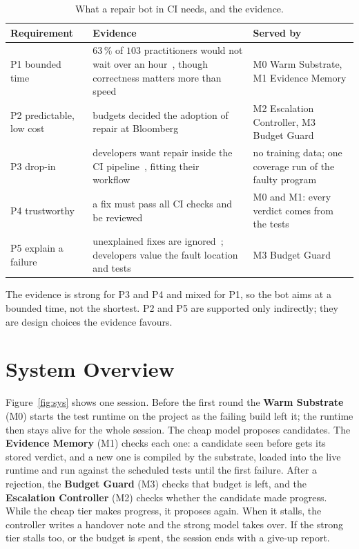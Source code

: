 \begin{table}[htbp]
\centering
\caption{What a repair bot in CI needs, and the evidence.}
\label{tab:sys-needs}
\footnotesize
\begin{tabularx}{\textwidth}{@{}>{\raggedright\arraybackslash}p{} >{\raggedright\arraybackslash}X >{\raggedright\arraybackslash}p{}@{}}
\toprule
Requirement & Evidence & Served by\\
\midrule
P1 bounded time & $63\,\%$ of $103$ practitioners would not wait over an hour~\citep{noller2022trust}, though correctness matters more than speed~\citep{winter2023feel} & M0 Warm Substrate, M1 Evidence Memory\\
P2 predictable, low cost & budgets decided the adoption of repair at Bloomberg~\citep{kirbas2021bloomberg} & M2 Escalation Controller, M3 Budget Guard\\
P3 drop-in & developers want repair inside the CI pipeline~\citep{noller2022trust}, fitting their workflow~\citep{winter2022bloomberg} & no training data; one coverage run of the faulty program\\
P4 trustworthy & a fix must pass all CI checks and be reviewed~\citep{kirbas2021bloomberg} & M0 and M1: every verdict comes from the tests\\
P5 explain a failure & unexplained fixes are ignored~\citep{winter2022bloomberg}; developers value the fault location and tests~\citep{noller2022trust} & M3 Budget Guard\\
\bottomrule
\end{tabularx}
\end{table}

The evidence is strong for P3 and P4 and mixed for P1, so the bot aims at a
bounded time, not the shortest. P2 and P5 are supported only indirectly; they
are design choices the evidence favours.

\section{System Overview}
\label{sec:sys-overview}

Figure~\ref{fig:sys} shows one session. Before the first round the
\textbf{Warm Substrate} (M0) starts the test runtime on the project as the
failing build left it; the runtime then stays alive for the whole session. The
cheap model proposes candidates. The \textbf{Evidence Memory} (M1) checks each
one: a candidate seen before gets its stored verdict, and a new one is
compiled by the substrate, loaded into the live runtime and run against the
scheduled tests until the first failure. After a rejection, the \textbf{Budget
Guard} (M3) checks that budget is left, and the \textbf{Escalation Controller}
(M2) checks whether the candidate made progress. While the cheap tier makes
progress, it proposes again. When it stalls, the controller writes a handover
note and the strong model takes over. If the strong tier stalls too, or the
budget is spent, the session ends with a give-up report.

